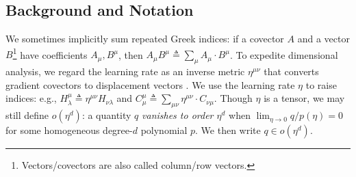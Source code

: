 \documentclass{article}
\theoremstyle{plain}
\theoremstyle{definition}
\begin{document}

\subsection{Background and Notation} \label{sect:background}
       

        We sometimes implicitly sum repeated Greek indices: if a covector $A$
        and a vector $B$\footnote{
            Vectors/covectors are also called column/row vectors.
        } have coefficients $A_\mu, B^\mu$, then 
        $
            A_\mu B^\mu
            \triangleq
            \sum_\mu A_\mu \cdot B^\mu
        $.
        To expedite dimensional analysis, we regard the learning rate as an
        inverse metric $\eta^{\mu\nu}$ that converts gradient covectors to
        displacement vectors \citep{bo13}.  We use the learning rate
        $\eta$ to raise indices: e.g.,
        $
            H^{\mu}_{\lambda}
            \triangleq
            \eta^{\mu\nu} H_{\nu\lambda}
        $ and
        $
            C^{\mu}_{\mu}
            \triangleq
            \sum_{\mu \nu} \eta^{\mu\nu} \cdot C_{\nu\mu}
        $.
        Though $\eta$ is a tensor, we may still define $o(\eta^d)$: a quantity
        $q$ \emph{vanishes to order $\eta^d$} when $\lim_{\eta\to 0} q/p(\eta)
        = 0$ for some homogeneous degree-$d$ polynomial $p$.  We then write $q
        \in o(\eta^d)$.



\end{document}
